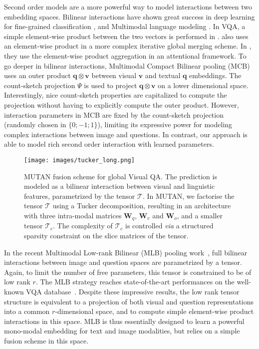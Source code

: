 \documentclass[10pt,twocolumn,letterpaper]{article}
\newcommand{\tens}[1]{
\bm{\mathcal{#1}}
}
\newcommand{\mat}[1]{\bm{#1}}
\newcommand{\q}{\mathbf{q}}
\newcommand{\vv}{\mathbf{v}}
\begin{document}
Second order models are a more powerful way to model interactions between two embedding spaces. Bilinear interactions have shown great success in deep learning for fine-grained classification \cite{lin2015bilinear}, and Multimodal language modeling  \cite{icml2014c2_kiros14}.
In VQA, a simple element-wise product between the two vectors is performed in \cite{VQA}. \cite{kim2016b} also uses  an element-wise product
in a more complex iterative global merging scheme.  In \cite{NIPS2016_6261}, they use the element-wise product aggregation in an attentional framework. To go deeper in bilinear interactions,  Multimodal Compact Bilinear pooling (MCB)~\cite{fukui16mcb} uses an outer product $\q \otimes \vv$ between visual $\vv$ and textual $\q$ embeddings. The count-sketch projection \cite{Charikar:2002:FFI:646255.684566} $\Psi$
is used to project $\q \otimes \vv$ on a lower dimensional space. Interestingly, nice count-sketch properties are capitalized to compute the projection
without having to explicitly compute the outer product. 
However, interaction parameters in MCB are fixed
by the count-sketch projection (randomly chosen in $\{0; -1; 1\}$), limiting its expressive power for modeling complex interactions between image and questions. In contrast, our approach is able to model 
rich second order interaction with learned parameters. 

\begin{figure*}[htbp]
\begin{center}
\texttt{[image: images/tucker\_long.png]}
\caption{\label{whole_model} MUTAN fusion scheme for global Visual QA. 
The prediction is modeled as a bilinear interaction between visual and linguistic features, parametrized by the tensor $\tens{T}$. 
In MUTAN, we factorise the tensor $\tens{T}$ using a Tucker decomposition, resulting in an architecture with three intra-modal matrices $\mat{W}_q$, $\mat{W}_v$ and $\mat{W}_o$, 
and a smaller tensor $\tens{T}_c$. The complexity of $\tens{T}_c$ is controlled \textit{via} a structured sparsity constraint on the slice matrices of the tensor.} 
\end{center}
\end{figure*}


In the recent Multimodal Low-rank Bilinear (MLB) pooling work~\cite{Kim2017}, full bilinear interactions 
between image and question spaces are parametrized by a tensor. Again, to limit the number of free parameters, this tensor is constrained to be of low rank $r$. The MLB strategy reaches state-of-the-art performances on the  well-known VQA database~\cite{VQA}. Despite these impressive results, the low rank tensor structure is equivalent to a projection of both visual and question representations into a common $r$-dimensional space,  and to compute simple element-wise product interactions in this space. 
MLB is thus essentially designed to learn a powerful mono-modal embedding for text and image modalities, but relies on a simple 
fusion scheme in this space. 
\end{document}
